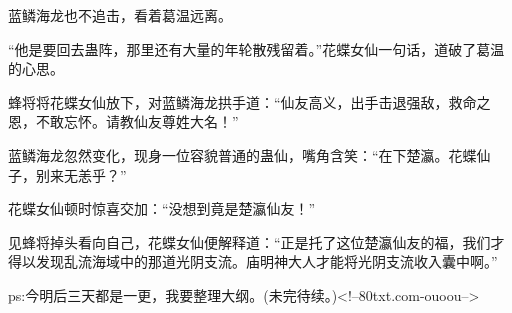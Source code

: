 \begin{this_body}
蓝鳞海龙也不追击，看着葛温远离。

“他是要回去蛊阵，那里还有大量的年轮散残留着。”花蝶女仙一句话，道破了葛温的心思。

蜂将将花蝶女仙放下，对蓝鳞海龙拱手道：“仙友高义，出手击退强敌，救命之恩，不敢忘怀。请教仙友尊姓大名！”

蓝鳞海龙忽然变化，现身一位容貌普通的蛊仙，嘴角含笑：“在下楚瀛。花蝶仙子，别来无恙乎？”

花蝶女仙顿时惊喜交加：“没想到竟是楚瀛仙友！”

见蜂将掉头看向自己，花蝶女仙便解释道：“正是托了这位楚瀛仙友的福，我们才得以发现乱流海域中的那道光阴支流。庙明神大人才能将光阴支流收入囊中啊。”

ps:今明后三天都是一更，我要整理大纲。(未完待续。)<!--80txt.com-ouoou-->

\end{this_body}

